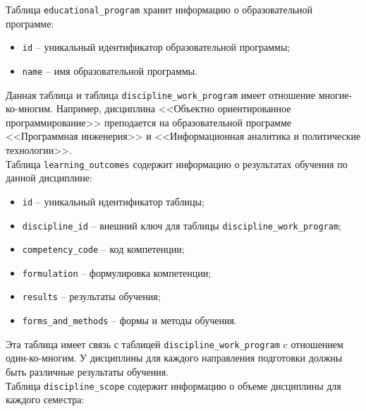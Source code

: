Таблица \texttt{educational\_program} хранит информацию о образовательной программе:

\begin{itemize}
	\item \texttt{id} -- уникальный идентификатор образовательной программы;
	\item \texttt{name} -- имя образовательной программы.
\end{itemize}
 
Данная таблица и таблица \texttt{discipline\_work\_program} имеет отношение многие-ко-многим. Например, дисциплина <<Объектно ориентированное программирование>> преподается на образовательной программе <<Программная инженерия>> и <<Информационная аналитика и политические технологии>>.\\

Таблица \texttt{learning\_outcomes} содержит информацию о результатах обучения по данной дисциплине:

\begin{itemize}
	\item \texttt{id} -- уникальный идентификатор таблицы;
	\item \texttt{discipline\_id} -- внешний ключ для таблицы \texttt{discipline\_work\_program};
	\item \texttt{competency\_code} -- код компетенции;
	\item \texttt{formulation} -- формулировка компетенции;
	\item \texttt{results} -- результаты обучения;
	\item \texttt{forms\_and\_methods} -- формы и методы обучения.
\end{itemize}

Эта таблица имеет связь с таблицей \texttt{discipline\_work\_program} c отношением один-ко-многим. У дисциплины для каждого направления подготовки должны быть различные результаты обучения.\\

Таблица \texttt{discipline\_scope} содержит информацию о объеме дисциплины для каждого семестра:

